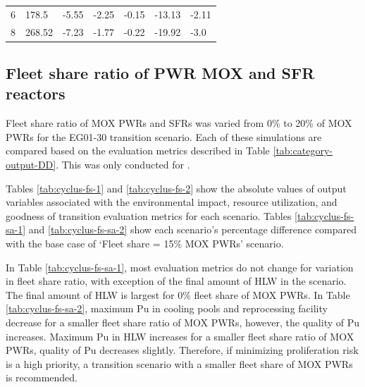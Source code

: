 \begin{table}[H]
\begin{tabularx}{\textwidth}{L|LLLLLL}
6  & 178.5            & -5.55                          & -2.25         & -0.15                       & -13.13            & -2.11                           \\
8  & 268.52           & -7.23                          & -1.77         & -0.22                       & -19.92            & -3.0                           \\ \hline
        \end{tabularx}
        \end{table}

\subsection{Fleet share ratio of PWR MOX and SFR reactors}

Fleet share ratio of \gls{MOX} \glspl{PWR} and \glspl{SFR}
was varied from 0\% to 20\% of \gls{MOX} \glspl{PWR} for the 
EG01-30 transition scenario. 
Each of these simulations are compared based on the evaluation 
metrics described in Table \ref{tab:category-output-DD}.
This was only conducted for \Cyclus. 

Tables \ref{tab:cyclus-fs-1} and \ref{tab:cyclus-fs-2} show 
the absolute values of 
output variables associated with the environmental impact, 
resource utilization, and goodness of transition evaluation 
metrics for each scenario. 
Tables \ref{tab:cyclus-fs-sa-1} and \ref{tab:cyclus-fs-sa-2} 
show each scenario's percentage 
difference compared with the base case of `Fleet share = 15\% 
\gls{MOX} \glspl{PWR}' scenario. 

In Table \ref{tab:cyclus-fs-sa-1}, most evaluation metrics do not change 
for variation in fleet share ratio, with exception of the final 
amount of HLW in the scenario. 
The final amount of HLW is largest for 0\% fleet share of \gls{MOX} 
\glspl{PWR}. 
In Table \ref{tab:cyclus-fs-sa-2}, maximum Pu in cooling pools and 
reprocessing facility 
decrease for a smaller fleet share ratio of \gls{MOX} \glspl{PWR}, 
however, the quality of Pu increases. 
Maximum Pu in HLW increases for a smaller fleet share ratio
of \gls{MOX} \glspl{PWR}, quality of Pu decreases slightly.
Therefore, if minimizing proliferation risk is a high priority, 
a transition scenario 
with a smaller fleet share of \gls{MOX} \glspl{PWR} is recommended. 

